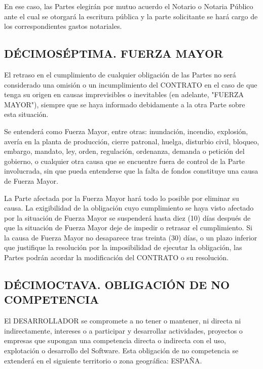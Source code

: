 \documentclass[a4paper,11pt]{report}
\begin{document}
	En ese caso, las Partes elegirán por mutuo acuerdo el Notario o Notaria
	Público ante el cual se otorgará la escritura pública y la parte
	solicitante se hará cargo de los correspondientes gastos notariales.

	\subsection*{DÉCIMOSÉPTIMA. FUERZA MAYOR}

	El retraso en el cumplimiento de cualquier obligación de las Partes no
	será considerado una omisión o un incumplimiento del CONTRATO en el caso
	de que tenga su origen en causas imprevisibles o inevitables (en
	adelante, "FUERZA MAYOR"), siempre que se haya informado debidamente a
	la otra Parte sobre esta situación.

	Se entenderá como Fuerza Mayor, entre otras: inundación, incendio,
	explosión, avería en la planta de producción, cierre patronal, huelga,
	disturbio civil, bloqueo, embargo, mandato, ley, orden, regulación,
	ordenanza, demanda o petición del gobierno, o cualquier otra causa que
	se encuentre fuera de control de la Parte involucrada, sin que pueda
	entenderse que la falta de fondos constituye una causa de Fuerza Mayor.

	La Parte afectada por la Fuerza Mayor hará todo lo posible por eliminar
	su causa. La exigibilidad de la obligación cuyo cumplimiento se haya
	visto afectado por la situación de Fuerza Mayor se suspenderá hasta diez
	(10) días después de que la situación de Fuerza Mayor deje de impedir o
	retrasar el cumplimiento. Si la causa de Fuerza Mayor no desaparece tras
	treinta (30) días, o un plazo inferior que justifique la resolución por
	la imposibilidad de ejecutar la obligación, las Partes podrán acordar la
	modificación del CONTRATO o su resolución.

	\subsection*{DÉCIMOCTAVA. OBLIGACIÓN DE NO COMPETENCIA}

	El DESARROLLADOR se compromete a no tener o mantener, ni directa ni
	indirectamente, intereses o a participar y desarrollar actividades,
	proyectos o empresas que supongan una competencia directa o indirecta
	con el uso, explotación o desarrollo del Software. Esta obligación de no
	competencia se extenderá en el siguiente territorio o zona geográfica:
	ESPAÑA.
\end{document}
